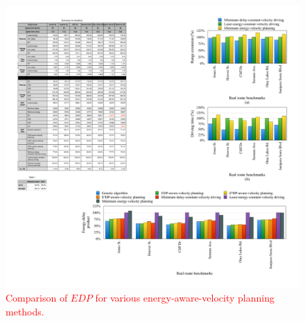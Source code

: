 \documentclass{IEEEtran}
\begin{document}
\begin{figure}	 %
\centering
\includegraphics[width=\hsize]{Figures/EDP_comp_bar.pdf}
\caption{\textcolor{red}{Comparison of $EDP$ for various energy-aware-velocity planning methods.}}
\label{fig:EDP_bar}
\end{figure} 


\end{document}
